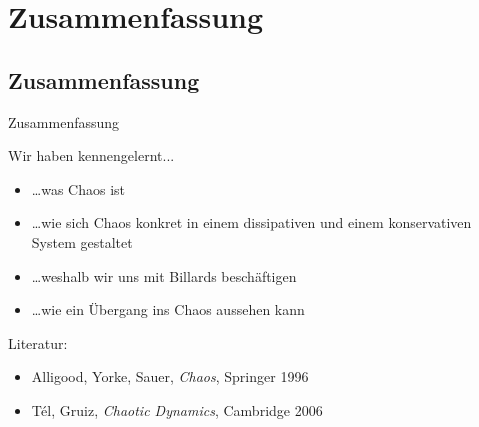 \section{Zusammenfassung}

\subsection{Zusammenfassung}

\begin{frame}{Zusammenfassung}

  Wir haben kennengelernt...

  \begin{itemize}
  \item \dots was \alert{Chaos} ist
  \item \dots wie sich Chaos konkret in einem dissipativen und einem konservativen System gestaltet
  \item \dots weshalb wir uns mit \alert{Billards} beschäftigen
  \item \dots wie ein \alert{Übergang} ins Chaos aussehen kann
  \end{itemize}

  Literatur:
  \begin{itemize}
  \item Alligood, Yorke, Sauer, \emph{Chaos}, Springer 1996
  \item T\'el, Gruiz, \emph{Chaotic Dynamics}, Cambridge 2006
  \end{itemize}

\end{frame}
